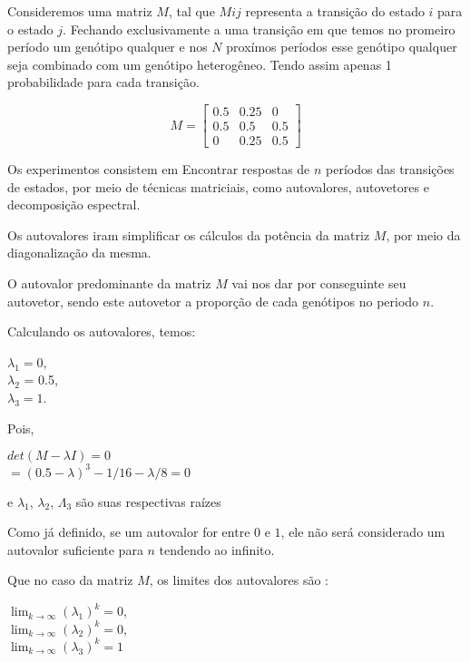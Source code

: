 \documentclass[a4paper,12pt]{article}
\begin{document}
Consideremos uma matriz $M$, tal que $Mij$ representa a transição do estado $i$ para o estado $j$. Fechando exclusivamente a uma transição em que temos no promeiro período um genótipo qualquer e nos $N$ proxímos períodos esse genótipo qualquer seja combinado com um genótipo heterogêneo. Tendo assim apenas 1 probabilidade para cada transição. 

\begin{displaymath}
M = \begin{bmatrix}
0.5&0.25&0\\
0.5&0.5&0.5\\
0&0.25&0.5
\end{bmatrix}
\end{displaymath}

Os experimentos consistem em Encontrar respostas de $n$ períodos das transições de estados, por meio de técnicas matriciais, como autovalores, autovetores e decomposição espectral.

Os autovalores iram simplificar os cálculos da potência da matriz $M$, por meio da diagonalização da mesma. 

O autovalor predominante da matriz $M$ vai nos dar por conseguinte seu autovetor, sendo este autovetor a proporção de cada genótipos no periodo $n$.

Calculando os autovalores, temos:
\begin{center}
    $\lambda_1 = 0$,\\ $\lambda_2$ = 0.5,\\ $\lambda_3 = 1$.
\end{center}

Pois,
\begin{center}
    $det(M-\lambda I) = 0$\\
    $= (0.5 - \lambda)^3 - 1/16 - \lambda/8 = 0$
\end{center}
e $\lambda_1$, $\lambda_2$, $\Lambda_3$ são suas respectivas raízes

Como já definido, se um autovalor for entre $0$ e $1$, ele não será considerado um autovalor suficiente para $n$ tendendo ao infinito.

Que no caso da matriz $M$, os limites dos autovalores são :
\begin{center}
    $\lim_{k\to\infty} (\lambda_1)^k = 0$,\\
    $\lim_{k\to\infty} (\lambda_2)^k = 0$,\\
    $\lim_{k\to\infty} (\lambda_3)^k = 1$
\end{center}
\end{document}
